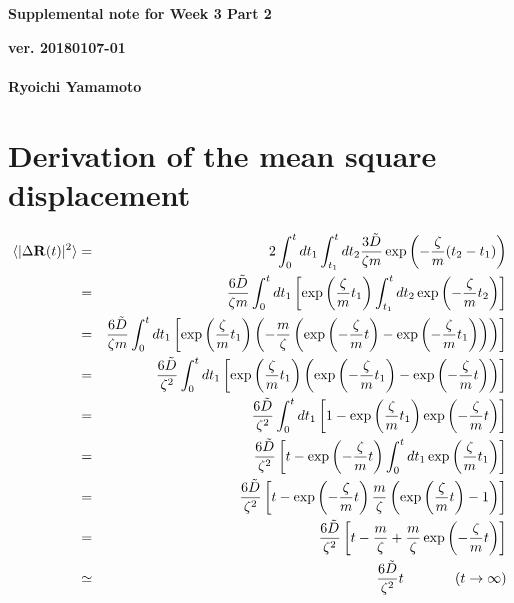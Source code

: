 \documentclass[a4paper,11pt]{article}
\begin{document}
\begin{center}
  {\LARGE\bf Supplemental note for Week 3 Part 2}
  \end{center}
\begin{flushright}
  {\large\bf ver. 20180107-01}\\
 \ \\
{\large\bf Ryoichi Yamamoto}\\
\end{flushright}

\section{Derivation of the mean square displacement}

\begin{eqnarray}
\langle |\Delta {\bf R}(t)|^2\rangle 
&=&2
\int_{0}^{t}d t_1 \int_{t_1}^{t}d t_2 
\frac{3\tilde{D}}{\zeta m} \exp\left(-\frac{\zeta}{m}(t_2-t_1)\right)\\
&=&\frac{6\tilde{D}}{\zeta m}
\int_{0}^{t}d t_1 \left[ \exp\left(\frac{\zeta}{m}t_1\right)
\int_{t_1}^{t}d t_2 \exp\left(-\frac{\zeta}{m}t_2\right)\right]\\
&=&\frac{6\tilde{D}}{\zeta m}
\int_{0}^{t}d t_1
\left[
\exp
\left(\frac{\zeta}{m}t_1\right)
\left(-\frac{m}{\zeta}\left(
\exp\left(-\frac{\zeta}{m}t\right)
-\exp\left(-\frac{\zeta}{m}t_1\right)
\right)
\right)
\right]\\
&=&\frac{6\tilde{D}}{\zeta^2}
\int_{0}^{t}d t_1
\left[
\exp
\left(\frac{\zeta}{m}t_1\right)
\left(
\exp\left(-\frac{\zeta}{m}t_1\right)
-\exp\left(-\frac{\zeta}{m}t\right)
\right)
\right]
\\
&=&\frac{6\tilde{D}}{\zeta^2}
\int_{0}^{t}d t_1
\left[
1-
\exp
\left(\frac{\zeta}{m}t_1\right)
\exp\left(-\frac{\zeta}{m}t\right)
\right]
\\
&=&\frac{6\tilde{D}}{\zeta^2}
\left[
t-
\exp
\left(-\frac{\zeta}{m}t\right)
\int_{0}^{t}d t_1
\exp\left(\frac{\zeta}{m}t_1\right)
\right]
\\
&=&\frac{6\tilde{D}}{\zeta^2}
\left[
t-
\exp
\left(-\frac{\zeta}{m}t\right)
\frac{m}{\zeta}
\left(
\exp\left(\frac{\zeta}{m}t\right)-1\right)
\right]
\\
&=&\frac{6\tilde{D}}{\zeta^2}
\left[
t-\frac{m}{\zeta}+\frac{m}{\zeta}\exp\left(-\frac{\zeta}{m}t\right)
\right]
\\
&\simeq&
\frac{6\tilde{D}}{\zeta^2}t\ \ \ \ \ \ \ \ \ \ \ (t\rightarrow\infty)
\end{eqnarray}
\end{document}
